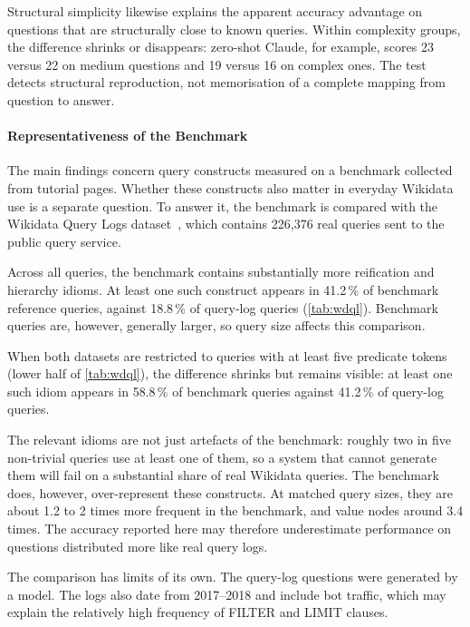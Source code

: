 Structural simplicity likewise explains the apparent accuracy advantage on questions that are structurally close to known queries.
Within complexity groups, the difference shrinks or disappears: zero-shot Claude, for example, scores 23 versus 22 on medium questions and 19 versus 16 on complex ones.
The test detects structural reproduction, not memorisation of a complete mapping from question to answer.

\paragraph{Representativeness of the Benchmark}



The main findings concern query constructs measured on a benchmark collected from tutorial pages.
Whether these constructs also matter in everyday Wikidata use is a separate question.
To answer it, the benchmark is compared with the Wikidata Query Logs dataset~\parencite{walter2026wdql}, which contains 226,376 real queries sent to the public query service.

Across all queries, the benchmark contains substantially more reification and hierarchy idioms.
At least one such construct appears in 41.2\,\% of benchmark reference queries, against 18.8\,\% of query-log queries (\cref{tab:wdql}).
Benchmark queries are, however, generally larger, so query size affects this comparison.

When both datasets are restricted to queries with at least five predicate tokens (lower half of \cref{tab:wdql}), the difference shrinks but remains visible: at least one such idiom appears in 58.8\,\% of benchmark queries against 41.2\,\% of query-log queries.

The relevant idioms are not just artefacts of the benchmark: roughly two in five non-trivial queries use at least one of them, so a system that cannot generate them will fail on a substantial share of real Wikidata queries.
The benchmark does, however, over-represent these constructs.
At matched query sizes, they are about 1.2 to 2 times more frequent in the benchmark, and value nodes around 3.4 times.
The accuracy reported here may therefore underestimate performance on questions distributed more like real query logs.

The comparison has limits of its own.
The query-log questions were generated by a model.
The logs also date from 2017--2018 and include bot traffic, which may explain the relatively high frequency of FILTER and LIMIT clauses.
